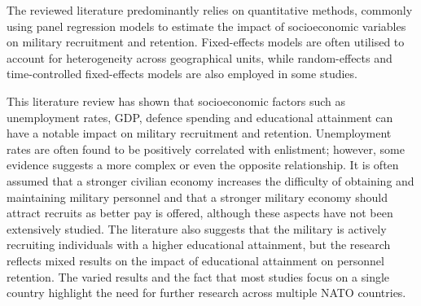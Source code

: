 The reviewed literature predominantly relies on quantitative methods, commonly using 
panel regression models to estimate the impact of socioeconomic variables on 
military recruitment and retention. Fixed-effects models are often utilised to account for 
heterogeneity across geographical units, while random-effects and time-controlled fixed-effects
models are also employed in some studies.

This literature review has shown that socioeconomic factors such as unemployment rates, 
GDP, defence spending and educational attainment can have a notable impact on military 
recruitment and retention. Unemployment rates are often found to be positively correlated 
with enlistment; however, some evidence suggests a more complex or even the opposite 
relationship. It is often assumed that a stronger civilian economy increases the 
difficulty of obtaining and maintaining military personnel and that a stronger military 
economy should attract recruits as better pay is offered, although these aspects have 
not been extensively studied. The literature also suggests that the military is 
actively recruiting individuals with a higher educational attainment, but the research 
reflects mixed results on the impact of educational attainment on personnel retention. 
The varied results and the fact that most studies focus on a single country highlight 
the need for further research across multiple NATO countries.
